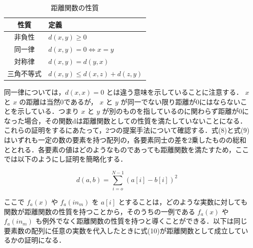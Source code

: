 \begin{table}[H]
    \caption{距離関数の性質}
    \centering
    \begin{tabular}{cl}
        \hline
        性質  & 定義 \\
        \hline \hline
        非負性     & $ d(x, y) \geq 0 $ \\
        同一律     & $ d(x, y) = 0 \Leftrightarrow x = y $ \\
        対称律     & $ d(x, y) = d(y, x) $ \\
        三角不等式 & $ d(x, y) \leq d(x, z) + d(z, y) $ \\
        \hline
    \end{tabular}
\end{table}

同一律については，$ d(x, x) = 0 $ とは違う意味を示していることに注意する． $ x $ と $ x $ の距離は当然0であるが， $ x $ と $ y $ が同一でない限り距離が0にはならないことを示している．つまり $ x $ と $ y $ が別のものを指しているのに関わらず距離が0になった場合，その関数dは距離関数としての性質を満たしていないことになる．これらの証明をするにあたって，2つの提案手法について確認する．式(8)と式(9)はいずれも一定の数の要素を持つ配列の，各要素同士の差を2乗したものの総和ととれる．各要素の値はどのようなものであっても距離関数を満たすため，ここでは以下のようにし証明を簡略化する．

\begin{equation}
    d(a, b) = \sum_{i=o}^{N-1}(a[i] - b[i])^2
\end{equation}

ここで $ f_{a}(x) $ や $ f_{a}(in_{m}) $ を $ a[i] $ とすることは，どのような実数に対しても関数が距離関数の性質を持つことから，そのうちの一例である $ f_{a}(x) $ や $ f_{a}(in_{m}) $ も例外でなく距離関数の性質を持つと導くことができる．以下は同じ要素数の配列に任意の実数を代入したときに式(10)が距離関数として成立しているかの証明になる．

